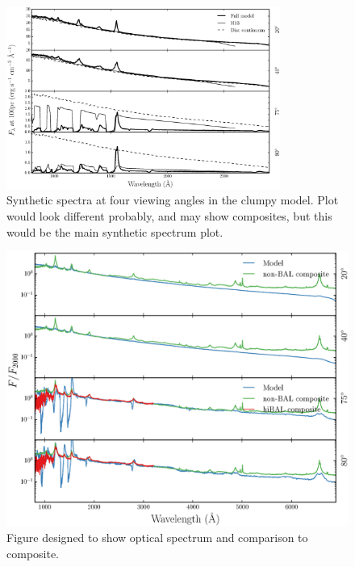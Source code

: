 \documentclass[useAMS,usenatbib]{mn2e_x}
\begin{document}
\begin{figure}
\centering
\includegraphics[width=0.8\textwidth]{figures/uvspec.eps}
\caption
{
Synthetic spectra at four viewing angles in the clumpy model. Plot would look different probably,
and may show composites, but this would be the main synthetic spectrum plot.
}
\label{fig:uvspec}
\end{figure}

\begin{figure}
\centering
\includegraphics[width=1.0\textwidth]{figures/opt.eps}
\caption
{
Figure designed to show optical spectrum and comparison to composite.
}
\label{fig:uvspec}
\end{figure}
\end{document}
